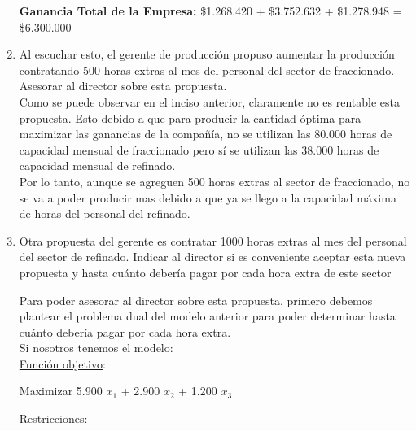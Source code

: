 \documentclass[10pt,a4paper]{article}
\begin{document}
\begin{enumerate}
    \vspace{0.5em}

    \textbf{Ganancia Total de la Empresa: } \$1.268.420 + \$3.752.632 + \$1.278.948 = \$6.300.000 \\

    \item Al escuchar esto, el gerente de producción propuso aumentar la producción contratando 500 horas extras al
    mes del personal del sector de fraccionado. Asesorar al director sobre esta propuesta.\\

    Como se puede observar en el inciso anterior, claramente no es rentable esta propuesta. Esto debido a que para producir
    la cantidad óptima para maximizar las ganancias de la compañía, no se utilizan las 80.000 horas de capacidad mensual de fraccionado pero sí se 
    utilizan las 38.000 horas de capacidad mensual de refinado. \\

    Por lo tanto, aunque se agreguen 500 horas extras al sector de fraccionado, no se va a poder producir mas debido a que ya se llego a la capacidad
    máxima de horas del personal del refinado.\\

    \item Otra propuesta del gerente es contratar 1000 horas extras al mes del personal del sector de refinado. Indicar
    al director si es conveniente aceptar esta nueva propuesta y hasta cuánto debería pagar por cada hora extra
    de este sector

    Para poder asesorar al director sobre esta propuesta, primero debemos plantear el problema dual del modelo anterior para poder determinar
    hasta cuánto debería pagar por cada hora extra.\\

    Si nosotros tenemos el modelo:\\

    \underline{Función objetivo}: 

    \begin{center}
        
        Maximizar 5.900 $x_{1}$ + 2.900 $x_{2}$ + 1.200 $x_{3}$

    \end{center}

    \clearpage

    \underline{Restricciones}: 

    \begin{itemize}


\end{itemize}
\end{enumerate}
\end{document}
